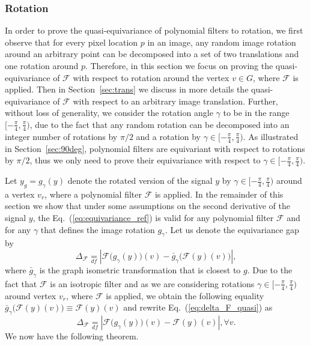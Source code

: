 \documentclass[10pt,journal,compsoc]{IEEEtran}
\newcommand{\df}{\mathop{=}\limits_{df}}
\newcommand{\mF}{\mathcal{F}}
\begin{document}
	\subsubsection{Rotation}
	\label{sec:rot}

In order to prove the quasi-equivariance of polynomial filters to rotation, we first observe that for every pixel location $p$ in an image, any random image rotation around an arbitrary point can be decomposed into a set of two translations and one rotation around $p$. Therefore, in this section we focus on proving the quasi-equivariance of $\mF$ with respect to rotation around the vertex $v \in G$, where $\mF$ is applied. Then in Section~\ref{sec:trans} we discuss in more details the quasi-equivariance of $\mF$ with respect to an arbitrary image translation. Further, without loss of generality, we consider the rotation angle $\gamma$ to be in the range $[-\frac{\pi}{4},\frac{\pi}{4})$, due to the fact that any random rotation can be decomposed into an integer number of rotations by $\pi/2$ and a rotation by $\gamma \in [-\frac{\pi}{4},\frac{\pi}{4})$. As illustrated in Section~\ref{sec:90deg}, polynomial filters are equivariant with respect to rotations by $\pi/2$, thus we only need to prove their equivariance with respect to $\gamma \in [-\frac{\pi}{4},\frac{\pi}{4})$.

Let $y_g = g_\gamma(y)$ denote the rotated version of the signal $y$ by $\gamma \in [-\frac{\pi}{4},\frac{\pi}{4})$ around a vertex $v_r$, where a polynomial filter $\mF$ is applied. In the remainder of this section we show that under some assumptions on the second derivative of the signal $y$, the Eq.~(\ref{eq:equivariance_ref}) is valid for any polynomial filter $\mathcal{F}$ and for any $\gamma$ that defines the image rotation $g_\gamma$. Let us denote the equivariance gap by
\begin{equation}
\Delta_\mathcal{F} \df \left| \mathcal{F}\big(g_{\gamma} (y)\big)(v) - \bar{g}_{\gamma}\big(\mathcal{F}(y)(v)\big) \right| ,
\label{eq:delta_F_quasi}
\end{equation}
where $\bar{g}_{\gamma}$ is the graph isometric transformation that is closest to $g$. Due to the fact that $\mF$ is an isotropic filter and as we are considering rotations $\gamma \in [-\frac{\pi}{4},\frac{\pi}{4})$ around vertex $v_r$, where $\mF$ is applied, we obtain the following equality $\bar{g}_{\gamma}\big(\mF(y)(v)\big) \equiv \mF(y)(v)$ and rewrite Eq.~(\ref{eq:delta_F_quasi}) as
\begin{equation}
\Delta_\mathcal{F} \df \left| \mathcal{F}\big(g_{\gamma} (y)\big)(v) - \mathcal{F}(y)(v) \right|, \forall v.
\end{equation}
We now have the following theorem.
\end{document}
